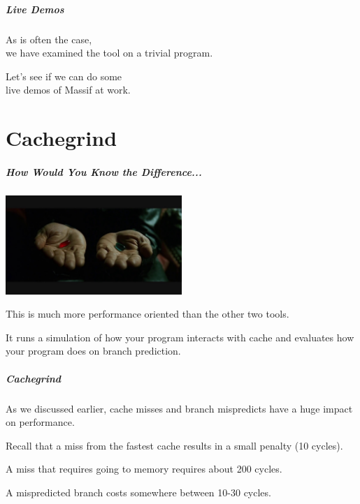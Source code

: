 \begin{frame}
\frametitle{Live Demos}

\large
\begin{changemargin}{2cm}
As is often the case, \\ we have examined the tool on a trivial program. 

Let's see if we can do some\\
 live demos of Massif at work.
\end{changemargin}
\end{frame}

\part{Cachegrind}
\begin{frame}
\partpage
\end{frame}


\begin{frame}
\frametitle{How Would You Know the Difference...}

\begin{center}
	\includegraphics[width=0.5\textwidth]{images/redbluepill.jpg}
\end{center}

This is much more performance oriented than the other two tools. 

 It runs a simulation of how your program interacts with cache and evaluates how your program does on branch prediction.
 

\end{frame}


\begin{frame}
\frametitle{Cachegrind}


 As we discussed earlier, cache misses and branch mispredicts have a huge impact on performance.
 
 Recall that a miss from the fastest cache results in a small penalty (10 cycles).
 
 A miss that requires going to memory requires about 200 cycles. 
 
 A mispredicted branch costs somewhere between 10-30 cycles.


\end{frame}

